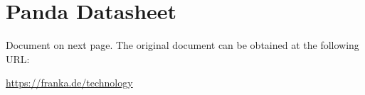 \chapter{Panda Datasheet}
\label{ann:panda_datasheet}

Document on next page. The original document can be obtained at the following URL: 

\url{https://franka.de/technology}

